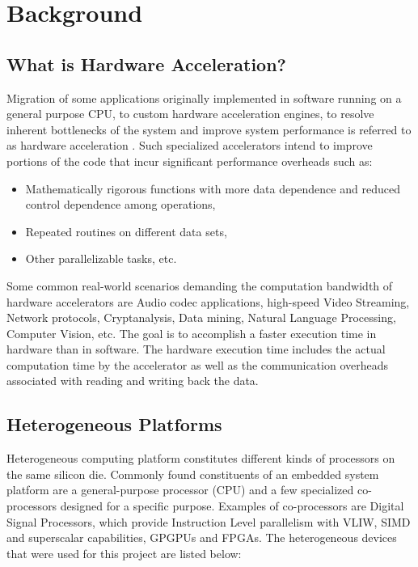 \chapter{Background}
\label{ch2_background}
\section{What is Hardware Acceleration?}
\label{sect2_1}
Migration of some applications originally implemented in software running on a general purpose CPU, to custom hardware acceleration engines, to resolve inherent bottlenecks of the system and improve system performance is referred to as hardware acceleration \cite{wiki_hwacc}. Such specialized accelerators intend to improve portions of the code that incur significant performance overheads such as:
\begin{itemize}
\item Mathematically rigorous functions with more data dependence and reduced control dependence among operations,
\item Repeated routines on different data sets,
\item Other parallelizable tasks, etc. 
\end{itemize}
Some common real-world scenarios demanding the computation bandwidth of hardware accelerators are Audio codec applications, high-speed Video Streaming, Network protocols, Cryptanalysis, Data mining, Natural Language Processing, Computer Vision, etc. \cite{ibm_devworks} The goal is to accomplish a faster execution time in hardware than in software. The hardware execution time includes the actual computation time by the accelerator as well as the communication overheads associated with reading and writing back the data. 

\section{Heterogeneous Platforms}
\label{sect2_2}
Heterogeneous computing platform constitutes different kinds of processors on the same silicon die. Commonly found constituents of an embedded system platform are a general-purpose processor (CPU) and a few specialized co-processors designed for a specific purpose. Examples of co-processors are Digital Signal Processors, which provide Instruction Level parallelism with VLIW, SIMD and superscalar capabilities, GPGPUs and FPGAs. The heterogeneous devices that were used for this project are listed below:
